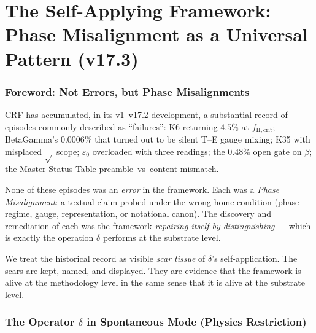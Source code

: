\documentclass[12pt, a4paper]{article}
\begin{document}

\part{The Self-Applying Framework: Phase Misalignment as a Universal Pattern (v17.3)}

\section{Foreword: Not Errors, but Phase Misalignments}

CRF has accumulated, in its v1--v17.2 development, a substantial
record of episodes commonly described as ``failures'': K6 returning
$4.5\%$ at $f_{\mathrm{II,crit}}$; BetaGamma's $0.0006\%$ that turned
out to be silent T--E gauge mixing; K35 with misplaced $\sqrt{}$
scope; $\varepsilon_0$ overloaded with three readings; the $0.48\%$
open gate on $\beta$; the Master Status Table preamble--vs--content
mismatch.

\begin{keybox}[title={Stance --- sigil of Part XV}]
None of these episodes was an \emph{error} in the framework. Each
was a \emph{Phase Misalignment}: a textual claim probed under the
wrong home-condition (phase regime, gauge, representation, or
notational canon). The discovery and remediation of each was the
framework \emph{repairing itself by distinguishing} --- which is
exactly the operation $\delta$ performs at the substrate level.

\smallskip
We treat the historical record as visible \emph{scar tissue} of
$\delta$'s self-application. The scars are kept, named, and
displayed. They are evidence that the framework is alive at the
methodology level in the same sense that it is alive at the
substrate level.
\end{keybox}

\section{The Operator $\delta$ in Spontaneous Mode (Physics Restriction)}
\end{document}
